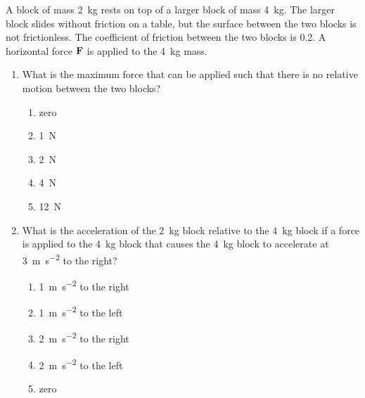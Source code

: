 \documentclass{../../../oss-apphys}
\begin{document}
\begin{multicols}{2}
  A block of mass \SI{2}{\kilo\gram} rests on top of a larger block of mass
  \SI{4}{\kilo\gram}. The larger block slides without friction on a table, but
  the surface between the two blocks is not frictionless. The coefficient of
  friction between the two blocks is 0.2. A horizontal force $\mathbf{F}$ is
  applied to the \SI{4}{\kilo\gram} mass.
  \begin{enumerate}[resume,leftmargin=18pt]
  \item What is the maximum force that can be applied such that there is no
    relative motion between the two blocks?
    \begin{enumerate}[nosep,leftmargin=18pt,label=(\Alph*)]
    \item zero
    \item\SI{1}{\newton}
    \item\SI{2}{\newton}
    \item\SI{4}{\newton}
    \item\SI{12}{\newton}
    \end{enumerate}
    \label{stacked1}
    
  \item What is the acceleration of the \SI{2}{\kilo\gram} block relative to the
    \SI{4}{\kilo\gram} block if a force is applied to the \SI{4}{\kilo\gram}
    block that causes the \SI{4}{\kilo\gram} block to accelerate at
    \SI{3}{\metre\per\second\squared} to the right?
    \begin{enumerate}[nosep,leftmargin=18pt,label=(\Alph*)]
    \item\SI{1}{\metre\per\second\squared} to the right
    \item\SI{1}{\metre\per\second\squared} to the left
    \item\SI{2}{\metre\per\second\squared} to the right
    \item\SI{2}{\metre\per\second\squared} to the left
    \item zero
    \end{enumerate}
    \label{stacked2}
  \end{enumerate}
\end{multicols}

\newpage


\genfreedirections


\end{document}
